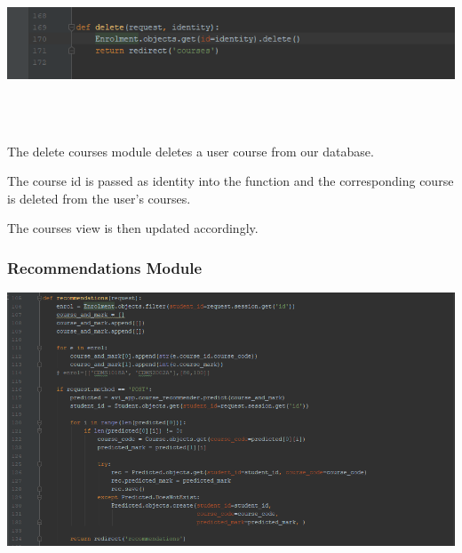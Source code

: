 \documentclass[10pt]{article}
\begin{document}
\begin{center}
\includegraphics[width=1.1\textwidth]{p11.png}
\end{center} \\ \\

\begin{description}[font=$\bullet$~\normalfont\scshape\color{red!50!black}]
\item [] The delete courses module deletes a user course from our database.
\item [] The course id is passed as identity into the function and the corresponding course is deleted from the user’s courses.
\item [] The courses view is then updated accordingly.

\end{description}

\subsubsection{Recommendations Module}

\begin{center}
\includegraphics[width=1.1\textwidth]{p12.png}
\end{center} \\ \\
\end{document}
